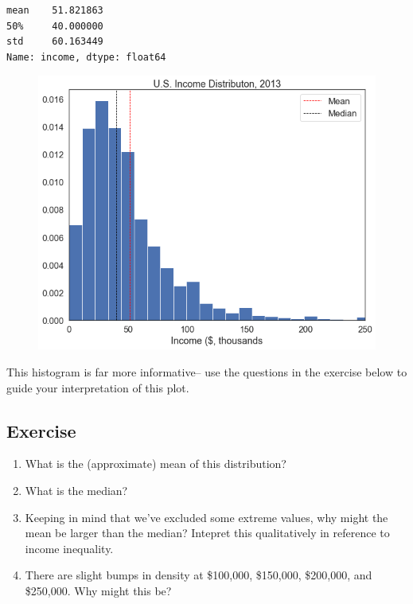 \documentclass[
  letterpaper,
  DIV=11,
  numbers=noendperiod]{scrreprt}
\providecommand{\tightlist}{%
  \setlength{\itemsep}{0pt}\setlength{\parskip}{0pt}}\usepackage{longtable,booktabs,array}
\begin{document}
\begin{verbatim}
mean    51.821863
50%     40.000000
std     60.163449
Name: income, dtype: float64
\end{verbatim}

\begin{figure}[H]

{\centering \includegraphics{notebooks/W05. Distributions and Basic Statistics_files/figure-pdf/cell-13-output-2.png}

}

\end{figure}

This histogram is far more informative-- use the questions in the
exercise below to guide your interpretation of this plot.

\hypertarget{exercise-12}{%
\subsection{Exercise}\label{exercise-12}}

\begin{enumerate}
\def\labelenumi{\arabic{enumi}.}
\tightlist
\item
  What is the (approximate) mean of this distribution?
\item
  What is the median?
\item
  Keeping in mind that we've excluded some extreme values, why might the
  mean be larger than the median? Intepret this qualitatively in
  reference to income inequality.
\item
  There are slight bumps in density at \$100,000, \$150,000, \$200,000,
  and \$250,000. Why might this be?
\end{enumerate}
\end{document}
